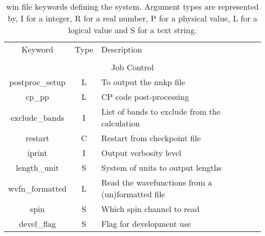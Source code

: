 \begin{table}
\begin{center}
\begin{tabular}{|c|c|p{6cm}|}
\hline
Keyword & Type & Description \\
        &      &             \\
\hline\hline
\multicolumn{3}{|c|}{Job Control} \\
\hline
{\sc postproc\_setup }   & L & To output the nnkp file \\
{\sc cp\_pp }   & L & CP code post-processing \\
{\sc exclude\_bands }   & I & List of bands to exclude from the calculation \\
{\sc restart }   & C & Restart from checkpoint file \\
{\sc iprint }   & I & Output verbosity level \\
{\sc length\_unit }   & S & System of units to output lengths \\
{\sc wvfn\_formatted }   & L & Read the wavefunctions from a  (un)formatted file  \\
{\sc spin }   & S & Which spin channel to read \\
{\sc devel\_flag }   & S & Flag for development use \\
\hline
\end{tabular}
\caption[win file keywords.]
{win file keywords defining the system.  Argument types
are represented by, I for a integer, R for a real number, P for a
physical value, L for a logical value and S for a text string.\\
}
\label{parameter_keywords2}
\end{center}
\end{table}





